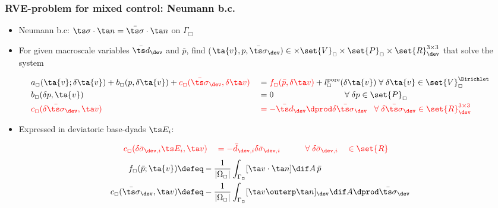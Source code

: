 \documentclass[11pt]{beamer} %
\newcommand{\pore}{\mathrm{pore}}
\begin{document}
\begin{frame}
\frametitle{RVE-problem for mixed control: Neumann b.c.}
 \begin{itemize}
  \item Neumann b.c: $\ts\sigma\cdot\ta n = \bar{\ts\sigma}\cdot\ta n$ on $\Gamma_\Box$
  \item For given macroscale variables $\bar{\ts d}_\dev$ and $\bar p$, find ($\ta{v},p,\bar{\ts\sigma}_\dev)\in\times\set{V}_\Box\times\set{P}_\Box\times\set{R}_\dev^{3\times3}$ that solve the system
 \end{itemize}
\vspace{-2truemm}
\begin{alignat*}{4}
    & a_\Box(\ta{v};\delta \ta{v}) +  b_\Box(p,\delta\ta{v}) + {\color{red}c_\Box(\bar{\ts\sigma}_\dev, \delta\ta v)}
    && =
    {\color{red}f_\Box(\bar{p},\delta\ta v)} + l^\pore_\Box(\delta \ta{v})
    \;\forall\; \delta \ta{v} \in \set{V}_\Box^{\Dirichlet}
 \\
    &b_\Box(\delta p, \ta{v})
    && =
    0
    \qquad\qquad\qquad\qquad\;\;\forall\; \delta p \in \set{P}_\Box
\\
    &\color{red}c_\Box(\delta\bar{\ts\sigma}_\dev, \ta v)
    && \color{red}=
    -\bar{\ts d}_\dev \dprod \delta\bar{\ts\sigma}_\dev
    \;\;\;\forall\; \delta\bar{\ts\sigma}_\dev \in \set{R}^{3\times 3}_\dev
\end{alignat*}
\vspace{-5truemm}
\begin{itemize}
 \item Expressed in deviatoric base-dyads $\ts E_i$:
\end{itemize}
\begin{alignat*}{4}
 &\color{red}c_\Box(\delta\bar{\sigma}_{\dev,i} \ts E_i, \ta v) &&\color{red}= -\bar{d}_{\dev,i} \delta\bar{\sigma}_{\dev,i}
&\quad\quad& \color{red}\forall\; \delta\bar{\sigma}_{\dev,i} &&\color{red}\in \set{R}
\end{alignat*}
\begin{align*}
    f_\Box(\bar{p};\ta{v}) & \defeq -\frac{1}{|\Omega_\Box|} \int_{\Gamma_\Box} [\ta v\cdot\ta n]\dif A \,\bar{p}
\\
    c_\Box(\bar{\ts\sigma}_\dev, \ta v) & \defeq -\frac{1}{|\Omega_\Box|} \int_{\Gamma_\Box} [\ta v\outerp\ta n]_\dev \dif A\dprod \bar{\ts\sigma}_\dev
\end{align*}
\end{frame}
\end{document}

